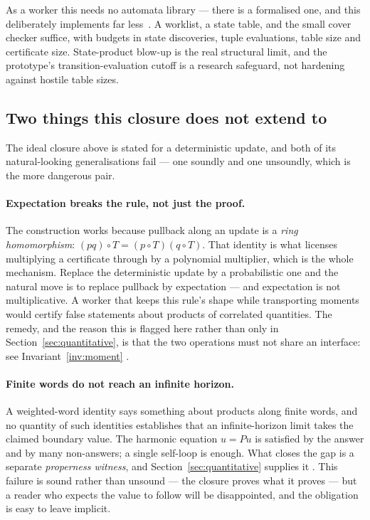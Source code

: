 As a worker this needs no automata library --- there is a formalised one, and
this deliberately implements far less~\cite{afp-tree}. A worklist, a state
table, and the small cover checker suffice, with budgets in state discoveries, tuple
evaluations, table size and certificate size. State-product blow-up is the real
structural limit, and the prototype's transition-evaluation cutoff is a research
safeguard, not hardening against hostile table sizes.

\subsection{Two things this closure does not extend to}

The ideal closure above is stated for a deterministic update, and both of its
natural-looking generalisations fail --- one soundly and one unsoundly, which
is the more dangerous pair.

\paragraph{Expectation breaks the rule, not just the proof.} The construction
works because pullback along an update is a \emph{ring homomorphism}:
$(pq)\circ T=(p\circ T)(q\circ T)$. That identity is what licenses multiplying
a certificate through by a polynomial multiplier, which is the whole mechanism.
Replace the deterministic update by a probabilistic one and the natural move is
to replace pullback by expectation --- and expectation is not multiplicative.
A worker that keeps this rule's shape while transporting moments would certify
false statements about products of correlated quantities. The remedy, and the
reason this is flagged here rather than only in
Section~\ref{sec:quantitative}, is that the two operations must not share an
interface: see Invariant~\ref{inv:moment} .

\paragraph{Finite words do not reach an infinite horizon.} A weighted-word
identity says something about products along finite words, and no quantity of
such identities establishes that an infinite-horizon limit takes the claimed
boundary value. The harmonic equation $u=Pu$ is satisfied by the answer and by
many non-answers; a single self-loop is enough. What closes the gap is a
separate \emph{properness witness}, and Section~\ref{sec:quantitative}
supplies it . This failure is sound rather than unsound --- the
closure proves what it proves --- but a reader who expects the value to follow
will be disappointed, and the obligation is easy to leave implicit.

